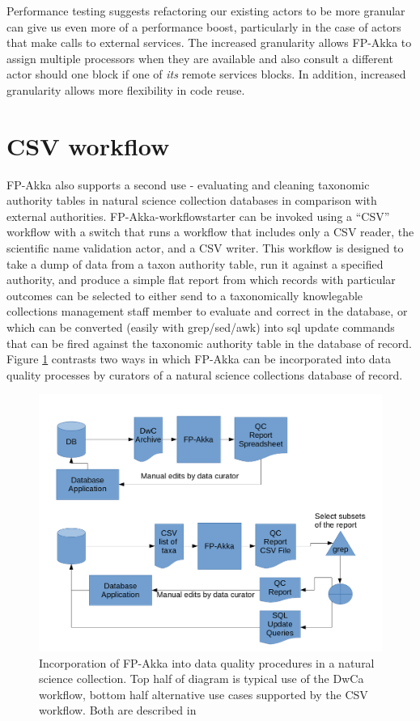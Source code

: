 \documentclass{article}
\begin{document}
Performance testing suggests refactoring our existing actors to be more granular can give us even more of a performance boost, particularly in the case of actors that make calls to external services. The increased granularity allows FP-Akka to assign multiple processors when they are available and also consult a different actor should one block if one of \emph{its} remote services blocks. In addition, increased granularity allows more flexibility in code re\-use.

\section{CSV workflow} \label{CSVWorkflow}

FP-Akka also supports a second use - evaluating and cleaning taxonomic authority tables in natural science collection databases in comparison with external authorities.  FP-Akka-workflowstarter can be invoked using a ``CSV'' workflow with a switch that runs a workflow that includes only a CSV reader, the scientific name validation actor, and a CSV writer.  This workflow is designed to take a dump of data from a taxon authority table, run it against a specified authority, and produce a simple flat report from which records with particular outcomes can be selected to either send to a taxonomically knowlegable collections management staff member to evaluate and correct in the database, or which can be converted (easily with grep/sed/awk) into sql update commands that can be fired against the taxonomic authority table in the database of record.  Figure \ref{fig:largerprocesses} contrasts two ways in which FP-Akka can be incorporated into data quality processes by curators of a natural science collections database of record.


\begin{figure}[h]
\includegraphics[width=\textwidth]{FP-Akka-externaldataflowpaths.png}
\caption{Incorporation of FP-Akka into data quality procedures in a natural science collection.  Top half of diagram is typical use of the DwCa workflow, bottom half alternative use cases supported by the CSV workflow. Both are described in \citep{Kurator_wiki_2016}}
\label{fig:largerprocesses}
\end{figure}
\end{document}
